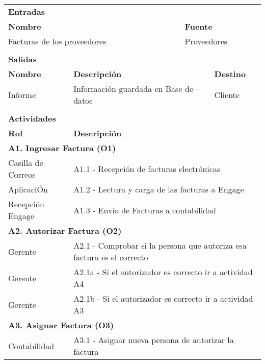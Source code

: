 \begin{longtable}{|llrrrrrr|}
          &       &       &       &       &       &       &  \\ \hline
    \multicolumn{8}{|l|}{\textbf{Entradas}} \\ \hline
    \multicolumn{5}{|l|}{\textbf{Nombre}}   & \multicolumn{3}{|l|}{\textbf{Fuente}} \\ \hline
    \multicolumn{5}{|l|}{Facturas de los proveedores} & \multicolumn{3}{|l|}{Proveedores} \\  \hline
       &       &       &       &       &       &       &  \\ \hline
    \multicolumn{8}{|l|}{\textbf{Salidas}} \\ \hline
    \textbf{Nombre} & \multicolumn{5}{|l|}{\textbf{Descripción}} & \multicolumn{2}{|l|}{\textbf{Destino}} \\ \hline
    Informe & \multicolumn{5}{|l|}{Información guardada en Base de datos} & \multicolumn{2}{|l|}{Cliente} \\ \hline
       &       &       &       &       &       &       &  \\ \hline
	\multicolumn{8}{|l|}{\textbf{Actividades}} \\ \hline
    \textbf{Rol} & \multicolumn{7}{|l|}{\textbf{Descripción}} \\ \hline
   
    \multicolumn{8}{|l|}{\textbf{A1. Ingresar Factura (O1)}} \\ \hline
   	Casilla de Correos & \multicolumn{7}{|l|}{A1.1 - Recepción de facturas electrónicas} \\ \hline 
   	AplicaciÓn & \multicolumn{7}{|l|}{A1.2 - Lectura y carga de las facturas a Engage} \\ \hline
  	Recepción Engage & \multicolumn{7}{|l|}{A1.3 - Envío de Facturas a contabilidad} \\ \hline
    
    \multicolumn{8}{|l|}{\textbf{A2. Autorizar Factura (O2)}} \\ \hline
    Gerente & \multicolumn{7}{|m{12cm}|}{A2.1 - Comprobar si la persona que autoriza esa factura es el correcto} \\ \hline
    Gerente & \multicolumn{7}{|m{12cm}|}{A2.1a - Si el autorizador es correcto ir a actividad A4 } \\ \hline
    Gerente & \multicolumn{7}{|l|}{A2.1b - Si el autorizador es correcto ir a actividad A3 } \\ \hline

    \multicolumn{8}{|l|}{\textbf{A3. Asignar Factura (O3)}} \\ \hline
    Contabilidad & \multicolumn{7}{|l|}{A3.1 - Asignar nueva persona de autorizar la factura} \\ \hline
    

\end{longtable}
